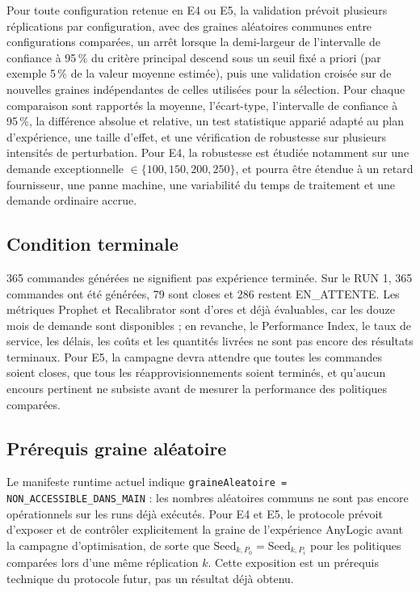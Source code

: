 \documentclass[11pt,a4paper]{article}
\newcommand{\code}[1]{\texttt{#1}}
\begin{document}
Pour toute configuration retenue en E4 ou E5, la validation prévoit plusieurs réplications par configuration, avec des graines aléatoires communes entre configurations comparées, un arrêt lorsque la demi-largeur de l'intervalle de confiance à 95\,\% du critère principal descend sous un seuil fixé a priori (par exemple 5\,\% de la valeur moyenne estimée), puis une validation croisée sur de nouvelles graines indépendantes de celles utilisées pour la sélection. Pour chaque comparaison sont rapportés la moyenne, l'écart-type, l'intervalle de confiance à 95\,\%, la différence absolue et relative, un test statistique apparié adapté au plan d'expérience, une taille d'effet, et une vérification de robustesse sur plusieurs intensités de perturbation. Pour E4, la robustesse est étudiée notamment sur une demande exceptionnelle $\in\{100,150,200,250\}$, et pourra être étendue à un retard fournisseur, une panne machine, une variabilité du temps de traitement et une demande ordinaire accrue.

\subsection{Condition terminale}
\label{sec:condition-terminale}

365 commandes générées ne signifient pas expérience terminée. Sur le RUN 1, 365 commandes ont été générées, 79 sont closes et 286 restent EN\_ATTENTE. Les métriques Prophet et Recalibrator sont d'ores et déjà évaluables, car les douze mois de demande sont disponibles ; en revanche, le Performance Index, le taux de service, les délais, les coûts et les quantités livrées ne sont pas encore des résultats terminaux. Pour E5, la campagne devra attendre que toutes les commandes soient closes, que tous les réapprovisionnements soient terminés, et qu'aucun encours pertinent ne subsiste avant de mesurer la performance des politiques comparées.

\subsection{Prérequis graine aléatoire}

Le manifeste runtime actuel indique \code{graineAleatoire = NON\_ACCESSIBLE\_DANS\_MAIN} : les nombres aléatoires communs ne sont pas encore opérationnels sur les runs déjà exécutés. Pour E4 et E5, le protocole prévoit d'exposer et de contrôler explicitement la graine de l'expérience AnyLogic avant la campagne d'optimisation, de sorte que $\text{Seed}_{k,P_0} = \text{Seed}_{k,P_i}$ pour les politiques comparées lors d'une même réplication $k$. Cette exposition est un prérequis technique du protocole futur, pas un résultat déjà obtenu.
\end{document}
